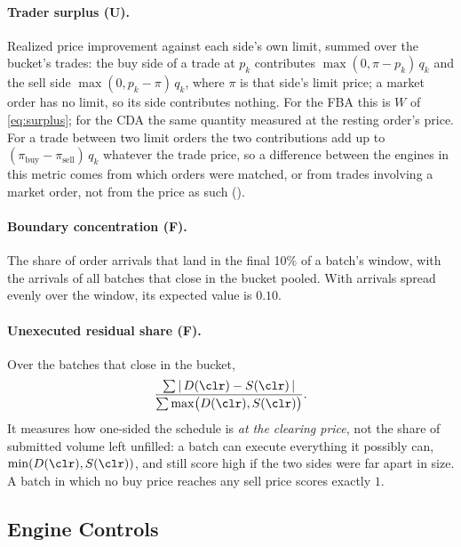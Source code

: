 \paragraph{Trader surplus (U).} Realized price improvement against each
side's own limit, summed over the bucket's trades: the buy side of a
trade at $p_k$ contributes $\max(0, \pi - p_k)\,q_k$ and the sell side
$\max(0, p_k - \pi)\,q_k$, where $\pi$ is that side's limit price; a market
order has no limit, so its side contributes nothing. For the FBA this is
$W$ of \eqref{eq:surplus}; for the CDA the same quantity measured at the
resting order's price. For a trade between two limit orders the two
contributions add up to $(\pi_{\text{buy}} - \pi_{\text{sell}})\,q_k$
whatever the trade price, so a difference between the engines in this
metric comes from which orders were matched, or from trades involving a
market order, not from the price as such ().

\paragraph{Boundary concentration (F).} The share of order arrivals that
land in the final 10\% of a batch's window, with the arrivals of all
batches that close in the bucket pooled. With arrivals spread evenly over the window, its
expected value is $0.10$.

\paragraph{Unexecuted residual share (F).} Over the batches that close in
the bucket,
\begin{equation}
  \label{eq:residualshare}
  \frac{\sum |\,D(\clr) - S(\clr)\,|}{\sum \max\bigl(D(\clr), S(\clr)\bigr)} .
\end{equation}
It measures how one-sided the schedule is \emph{at the clearing price},
not the share of submitted volume left unfilled: a batch can execute
everything it possibly can, $\min(D(\clr), S(\clr))$, and still score
high if the two sides were far apart in size. A batch in which no buy
price reaches any sell price scores exactly $1$.

\subsection{Engine Controls}
\label{sec:metricscontrol}

